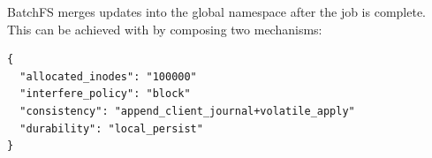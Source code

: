 BatchFS merges updates into the global namespace after the job is complete.
This can be achieved with by composing two mechanisms: 

\begin{listing}[h]
\begin{verbatim}
{     
  "allocated_inodes": "100000"
  "interfere_policy": "block"
  "consistency": "append_client_journal+volatile_apply"
  "durability": "local_persist"
}
\end{verbatim}
\end{listing}
